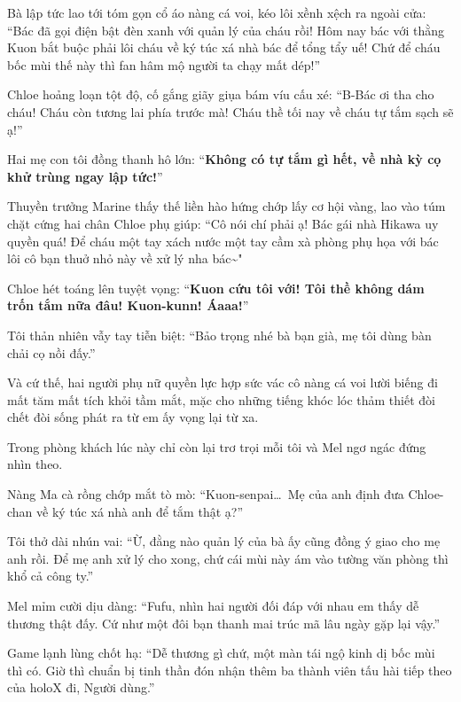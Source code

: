 \documentclass[../main.tex]{subfiles}
\begin{document}
Bà lập tức lao tới tóm gọn cổ áo nàng cá voi, kéo lôi xềnh xệch ra ngoài cửa: ``Bác đã gọi điện bật đèn xanh với quản lý của cháu rồi! Hôm nay bác với thằng Kuon bắt buộc phải lôi cháu về ký túc xá nhà bác để tổng tẩy uế! Chứ để cháu bốc mùi thế này thì fan hâm mộ người ta chạy mất dép!''

Chloe hoảng loạn tột độ, cố gắng giãy giụa bám víu cấu xé: ``B-Bác ơi tha cho cháu! Cháu còn tương lai phía trước mà! Cháu thề tối nay về cháu tự tắm sạch sẽ ạ!''

Hai mẹ con tôi đồng thanh hô lớn: ``\textbf{Không có tự tắm gì hết, về nhà kỳ cọ khử trùng ngay lập tức!}''

Thuyền trưởng Marine thấy thế liền hào hứng chớp lấy cơ hội vàng, lao vào túm chặt cứng hai chân Chloe phụ giúp: ``Cô nói chí phải ạ! Bác gái nhà Hikawa uy quyền quá! Để cháu một tay xách nước một tay cầm xà phòng phụ họa với bác lôi cô bạn thuở nhỏ này về xử lý nha bác\~{}"

Chloe hét toáng lên tuyệt vọng: ``\textbf{Kuon cứu tôi với! Tôi thề không dám trốn tắm nữa đâu! Kuon-kunn! Áaaa!}''

Tôi thản nhiên vẫy tay tiễn biệt: ``Bảo trọng nhé bà bạn già, mẹ tôi dùng bàn chải cọ nồi đấy.''

Và cứ thế, hai người phụ nữ quyền lực hợp sức vác cô nàng cá voi lười biếng đi mất tăm mất tích khỏi tầm mắt, mặc cho những tiếng khóc lóc thảm thiết đòi chết đòi sống phát ra từ em ấy vọng lại từ xa.

Trong phòng khách lúc này chỉ còn lại trơ trọi mỗi tôi và Mel ngơ ngác đứng nhìn theo.

Nàng Ma cà rồng chớp mắt tò mò: ``Kuon-senpai\dots\ Mẹ của anh định đưa Chloe-chan về ký túc xá nhà anh để tắm thật ạ?''

Tôi thở dài nhún vai: ``Ừ, đằng nào quản lý của bà ấy cũng đồng ý giao cho mẹ anh rồi. Để mẹ anh xử lý cho xong, chứ cái mùi này ám vào tường văn phòng thì khổ cả công ty.''

Mel mỉm cười dịu dàng: ``Fufu, nhìn hai người đối đáp với nhau em thấy dễ thương thật đấy. Cứ như một đôi bạn thanh mai trúc mã lâu ngày gặp lại vậy.''

Game lạnh lùng chốt hạ: ``Dễ thương gì chứ, một màn tái ngộ kinh dị bốc mùi thì có. Giờ thì chuẩn bị tinh thần đón nhận thêm ba thành viên tấu hài tiếp theo của holoX đi, Người dùng.''
\end{document}
